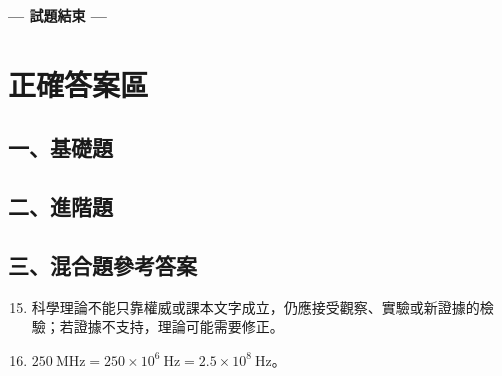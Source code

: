 \documentclass[10pt,a4paper]{article}
\begin{document}


\begin{center}
    \large \textbf{--- 試題結束 ---}
\end{center}

\label{EndOfExam}

\newpage
\section*{正確答案區}

\subsection*{一、基礎題}
\begin{center}
\end{center}

\subsection*{二、進階題}
\begin{center}
\end{center}

\subsection*{三、混合題參考答案}
\begin{enumerate}[label=\textbf{\arabic*.}, leftmargin=2em]
    \setcounter{enumi}{14}
    \item 科學理論不能只靠權威或課本文字成立，仍應接受觀察、實驗或新證據的檢驗；若證據不支持，理論可能需要修正。
    \item $250\ \text{MHz}=250\times 10^6\ \text{Hz}=2.5\times 10^8\ \text{Hz}$。
\end{enumerate}
\end{document}
